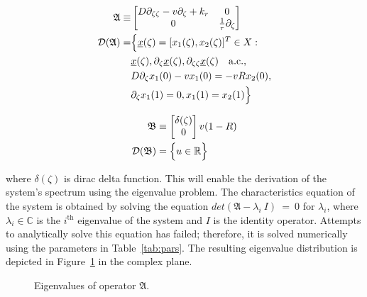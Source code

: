 \begin{equation} \label{eq:operator_A}
    \begin{aligned}
        \mathfrak{A} \equiv&
        \begin{bmatrix}
            D \partial_{\zeta \zeta} - v \partial_\zeta + k_r & 0 \\
            0 & \frac{1}{\tau} \partial_\zeta
        \end{bmatrix}\\
        \mathcal{D}(\mathfrak{A}) =& \Bigl\{ \underline{x}(\zeta) = [x_1(\zeta), x_2(\zeta)]^T \in X:\\
        &\underline{x}(\zeta), \partial_\zeta \underline{x}(\zeta), \partial_{\zeta \zeta} \underline{x}(\zeta) \quad \mathrm{a.c.},\\
        &D \partial_\zeta x_1(0) - v x_1(0) = -v R x_2(0),\\
        &\partial_\zeta x_1(1) = 0,
        x_1(1) = x_2(1) \Bigr\}
    \end{aligned}
\end{equation}

\begin{equation} \label{eq:operator_B}
    \begin{aligned}
        \mathfrak{B} &\equiv
        \begin{bmatrix}
            \delta(\zeta) \\
            0
        \end{bmatrix} v (1-R) \\
        \mathcal{D}(\mathfrak{B}) &= \Bigl\{ u \in \mathbb{R} \Bigr\}
    \end{aligned}
\end{equation}

where $\delta(\zeta)$ is dirac delta function. This will enable the derivation of the system's spectrum using the eigenvalue problem. The characteristics equation of the system is obtained by solving the equation $det(\mathfrak{A}-\lambda_i~I)~=~0$ for $\lambda_i$, where $\lambda_i \in \mathbb{C}$ is the $i^{\text{th}}$ eigenvalue of the system and $I$ is the identity operator. Attempts to analytically solve this equation has failed; therefore, it is solved numerically using the parameters in Table~\ref{tab:pars}. The resulting eigenvalue distribution is depicted in Figure~\ref{fig:eigval_dist} in the complex plane.

\begin{figure}[!htbp]
    \centering
    
    \caption{Eigenvalues of operator $\mathfrak{A}$.}
    \label{fig:eigval_dist}
\end{figure}


